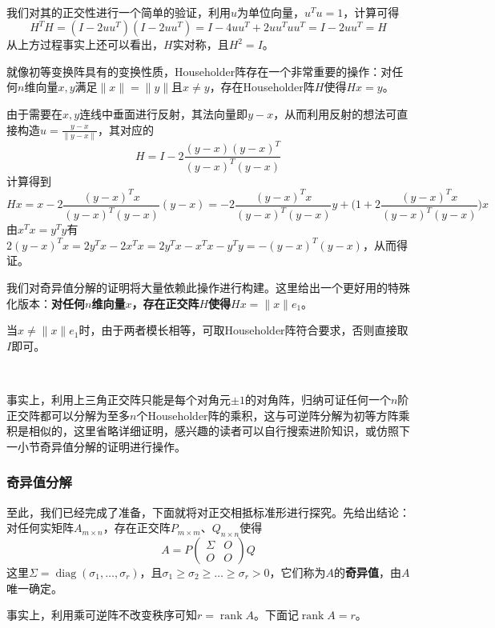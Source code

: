 \documentclass[a4paper,UTF8,fontset=windows]{ctexart}
\DeclareMathOperator{\diag}{diag}
\DeclareMathOperator{\rank}{rank}
\newcommand*{\note}{\noindent *}
\begin{document}
\

我们对其的正交性进行一个简单的验证，利用$u$为单位向量，$u^Tu=1$，计算可得
$$H^TH=(I-2uu^T)(I-2uu^T)=I-4uu^T+2uu^Tuu^T=I-2uu^T=H$$
从上方过程事实上还可以看出，$H$实对称，且$H^2=I$。

就像初等变换阵具有的变换性质，Householder阵存在一个非常重要的操作：对任何$n$维向量$x,y$满足$\|x\|=\|y\|$且$x\ne y$，存在Householder阵$H$使得$Hx=y$。

由于需要在$x,y$连线中垂面进行反射，其法向量即$y-x$，从而利用反射的想法可直接构造$u=\frac{y-x}{\|y-x\|}$，其对应的
$$H=I-2\frac{(y-x)(y-x)^T}{(y-x)^T(y-x)}$$
计算得到
$$Hx=x-2\frac{(y-x)^Tx}{(y-x)^T(y-x)}(y-x)=-2\frac{(y-x)^Tx}{(y-x)^T(y-x)}y+\bigg(1+2\frac{(y-x)^Tx}{(y-x)^T(y-x)}\bigg)x$$
由$x^Tx=y^Ty$有$2(y-x)^Tx=2y^Tx-2x^Tx=2y^Tx-x^Tx-y^Ty=-(y-x)^T(y-x)$，从而得证。

我们对奇异值分解的证明将大量依赖此操作进行构建。这里给出一个更好用的特殊化版本：\textbf{对任何$n$维向量$x$，存在正交阵$H$使得$Hx=\|x\|e_1$}。

当$x\ne\|x\|e_1$时，由于两者模长相等，可取Householder阵符合要求，否则直接取$I$即可。

\

\note 事实上，利用上三角正交阵只能是每个对角元$\pm1$的对角阵，归纳可证任何一个$n$阶正交阵都可以分解为至多$n$个Householder阵的乘积，这与可逆阵分解为初等方阵乘积是相似的，这里省略详细证明，感兴趣的读者可以自行搜索进阶知识，或仿照下一小节奇异值分解的证明进行操作。

\subsubsection{奇异值分解}
至此，我们已经完成了准备，下面就将对正交相抵标准形进行探究。先给出结论：对任何实矩阵$A_{m\times n}$，存在正交阵$P_{m\times m}$、$Q_{n\times n}$使得
$$A=P\begin{pmatrix}\Sigma&O\\O&O\end{pmatrix}Q$$
这里$\Sigma=\diag(\sigma_1,\dots,\sigma_r)$，且$\sigma_1\ge\sigma_2\ge\dots\ge\sigma_r>0$，它们称为$A$的\textbf{奇异值}，由$A$唯一确定。

\note 事实上，利用乘可逆阵不改变秩序可知$r=\rank A$。下面记$\rank A=r$。
\end{document}
